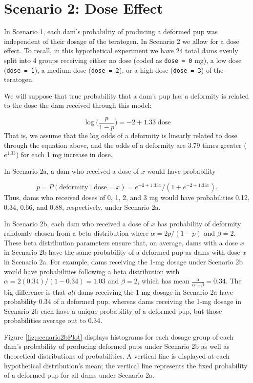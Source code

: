 \documentclass[
]{krantz}
\begin{document}
\hypertarget{scenario-2-dose-effect}{%
\section{Scenario 2: Dose Effect}\label{scenario-2-dose-effect}}

In Scenario 1, each dam's probability of producing a deformed pup was independent of their dosage of the teratogen. In Scenario 2 we allow for a dose effect. To recall, in this hypothetical experiment we have 24 total dams evenly split into 4 groups receiving either no dose (coded as \texttt{dose\ =\ 0} mg), a low dose (\texttt{dose\ =\ 1}), a medium dose (\texttt{dose\ =\ 2}), or a high dose (\texttt{dose\ =\ 3}) of the teratogen.

We will suppose that true probability that a dam's pup has a deformity is related to the dose the dam received through this model:

\[ \log \bigg(\frac{p}{1-p} \bigg) = -2 + 1.33\; \textrm{dose} \]
That is, we assume that the log odds of a deformity is linearly related to dose through the equation above, and the odds of a deformity are 3.79 times greater (\(e^{1.33}\)) for each 1 mg increase in dose.

In Scenario 2a, a dam who received a dose of \(x\) would have probability

\[p = P(\textrm{deformity}\mid \textrm{dose} = x) = e^{-2+1.33x}/(1+e^{-2+1.33x}). \]
Thus, dams who received doses of 0, 1, 2, and 3 mg would have probabilities 0.12, 0.34, 0.66, and 0.88, respectively, under Scenario 2a.

In Scenario 2b, each dam who received a dose of \(x\) has probability of deformity randomly chosen from a beta distribution where \(\alpha = 2p/(1-p)\) and \(\beta = 2\). These beta distribution parameters ensure that, on average, dams with a dose \(x\) in Scenario 2b have the same probability of a deformed pup as dams with dose \(x\) in Scenario 2a. For example, dams receiving the 1-mg dosage under Scenario 2b would have probabilities following a beta distribution with \(\alpha = 2(0.34)/(1-0.34) = 1.03\) and \(\beta = 2\), which has mean \(\frac{\alpha}{\alpha + \beta}=0.34\). The big difference is that \emph{all} dams receiving the 1-mg dosage in Scenario 2a have probability 0.34 of a deformed pup, whereas dams receiving the 1-mg dosage in Scenario 2b each have a unique probability of a deformed pup, but those probabilities average out to 0.34.

Figure \ref{fig:scenario2bPlot} displays histograms for each dosage group of each dam's probability of producing deformed pups under Scenario 2b as well as theoretical distributions of probabilities. A vertical line is displayed at each hypothetical distribution's mean; the vertical line represents the fixed probability of a deformed pup for all dams under Scenario 2a.
\end{document}
